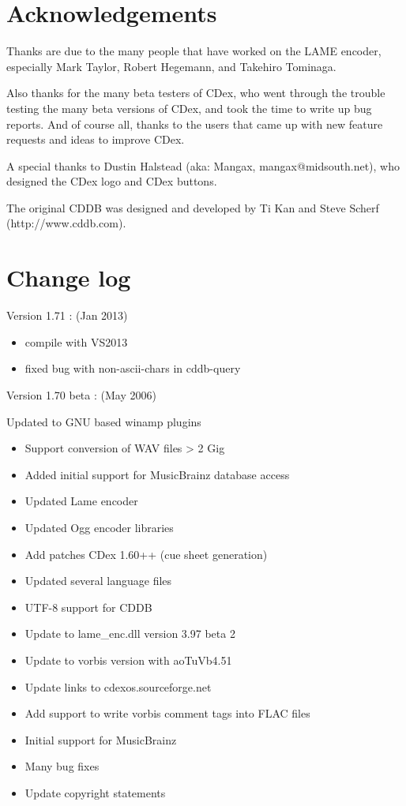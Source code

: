 \section{Acknowledgements}


Thanks are due to the many people that have worked on the LAME encoder, especially 
Mark Taylor, Robert Hegemann, and Takehiro Tominaga.

Also thanks for the many beta testers of CDex, who went through the trouble testing
the many beta versions of CDex, and took the time to write up bug reports. And of 
course all, thanks to the users that came up with new feature requests and ideas to improve CDex.

A special thanks to Dustin Halstead (aka: Mangax, mangax@midsouth.net),
who designed the CDex logo and CDex buttons.

The original CDDB was designed and developed by Ti Kan and Steve Scherf
(http://www.cddb.com).



\section{Change log}

Version 1.71 : (Jan 2013)

\begin{itemize}
\itemsep=0pt
\item compile with VS2013
\item fixed bug with non-ascii-chars in cddb-query 
\end{itemize}


Version 1.70 beta : (May 2006)

Updated to GNU based winamp plugins

\begin{itemize}
\itemsep=0pt
\item Support conversion of WAV files > 2 Gig
\item Added initial support for MusicBrainz database access
\item Updated Lame encoder
\item Updated Ogg encoder libraries
\item Add patches CDex 1.60++ (cue sheet generation)
\item Updated several language files
\item UTF-8 support for CDDB
\item Update to lame_enc.dll version 3.97 beta 2
\item Update to vorbis version with aoTuVb4.51
\item Update links to cdexos.sourceforge.net
\item Add support to write vorbis comment tags into FLAC files
\item Initial support for MusicBrainz
\item Many bug fixes
\item Update copyright statements
\end{itemize}


